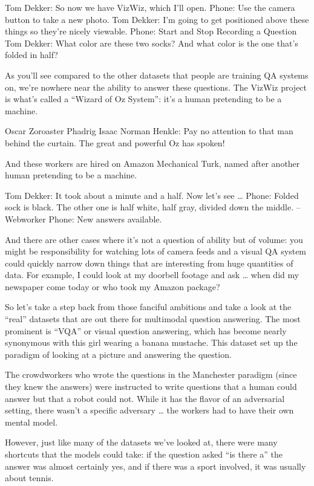 Tom Dekker: So now we have VizWiz, which I’ll open.
Phone: Use the camera button to take a new photo.
Tom Dekker: I’m going to get positioned above these things so they’re nicely viewable.
Phone: Start and Stop Recording a Question
Tom Dekker: What color are these two socks?  And what color is the one that’s folded in half?

As you’ll see compared to the other datasets that people are training QA systems on, we’re nowhere near the ability to answer these questions.  The VizWiz project is what’s called a “Wizard of Oz System”: it’s a human pretending to be a machine.

Oscar Zoroaster Phadrig Isaac Norman Henkle: Pay no attention to that man behind the curtain.  The great and powerful Oz has spoken!

And these workers are hired on Amazon Mechanical Turk, named after another human pretending to be a machine.

Tom Dekker: It took about a minute and a half.  Now let’s see …
Phone: Folded sock is black.  The other one is half white, half gray, divided down the middle.  –Webworker
Phone: New answers available.

And there are other cases where it’s not a question of ability but of volume: you might be responsibility for watching lots of camera feeds and a visual QA system could quickly narrow down things that are interesting from huge quantities of data.  For example, I could look at my doorbell footage and ask … when did my newspaper come today or who took my Amazon package?

So let’s take a step back from those fanciful ambitions and take a look at the “real” datasets that are out there for multimodal question answering.  The most prominent is “VQA” or visual question answering, which has become nearly synonymous with this girl wearing a banana mustache.  This dataset set up the paradigm of looking at a picture and answering the question.

The crowdworkers who wrote the questions in the Manchester paradigm (since they knew the answers) were instructed to write questions that a human could answer but that a robot could not.  While it has the flavor of an adversarial setting, there wasn’t a specific adversary … the workers had to have their own mental model.

However, just like many of the datasets we’ve looked at, there were many shortcuts that the models could take: if the question asked “is there a” the answer was almost certainly yes, and if there was a sport involved, it was usually about tennis.


